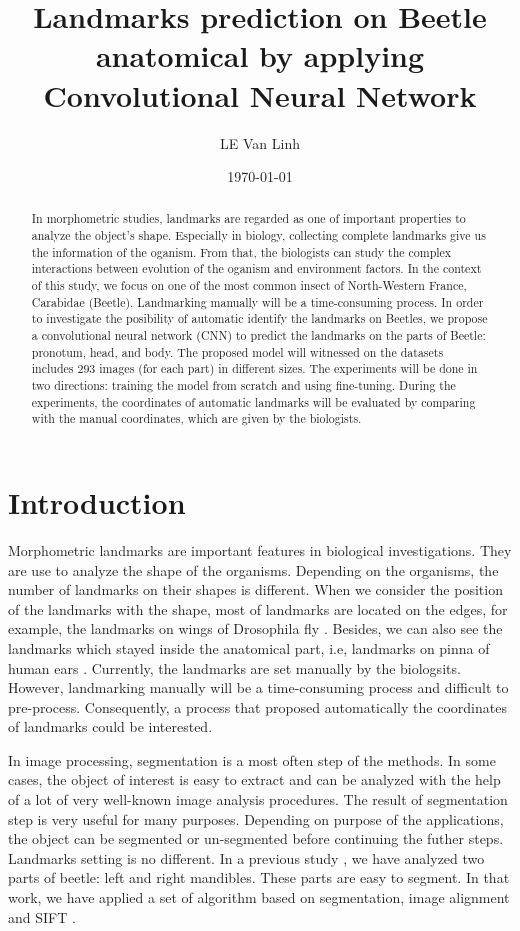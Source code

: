 \documentclass[12pt,a4paper]{article}
\begin{document}
\title{Landmarks prediction on Beetle anatomical by applying Convolutional Neural Network }
\author{LE Van Linh}
\date{\today}
\maketitle
\begin{abstract}
	In morphometric studies, landmarks are regarded as one of important properties to analyze the object's shape. Especially in biology, collecting complete landmarks give us the information of the oganism. From that, the biologists can study the complex interactions between evolution of the oganism and environment factors. In the context of this study, we focus on one of the most common insect of North-Western France, Carabidae (Beetle). Landmarking manually will be a time-consuming process. In order to investigate the posibility of automatic identify the landmarks on Beetles, we propose a convolutional neural network (CNN) to predict the landmarks on the parts of Beetle: pronotum, head, and body. The proposed model will witnessed on the datasets includes $293$ images (for each part) in different sizes. The experiments will be done in two directions: training the model from scratch and using fine-tuning. During the experiments, the coordinates of automatic landmarks will be evaluated by comparing with the manual coordinates, which are given by the biologists.
\end{abstract}
\section{Introduction}
Morphometric landmarks are important features in biological investigations. They are use to analyze the shape of the organisms. Depending on the organisms, the number of landmarks on their shapes is different. When we consider the position of the landmarks with the shape, most of landmarks are located on the edges, for example, the landmarks on wings of Drosophila fly \cite{.}. Besides, we can also see the landmarks which stayed inside the anatomical part, i.e, landmarks on pinna of human ears \cite{.}. Currently, the landmarks are set manually by the biologsits. However, landmarking manually will be a time-consuming process and difficult to pre-process. Consequently, a process that proposed automatically the coordinates of landmarks could be interested.

In image processing, segmentation is a most often step of the methods. In some cases, the object of
interest is easy to extract and can be analyzed with the help of a lot of very well-known image analysis procedures. The result of segmentation step is very useful for many purposes. Depending on purpose of the applications, the object can be segmented or un-segmented before continuing the futher steps. Landmarks setting is no different. In a previous study \cite{.}, we have analyzed two parts of beetle: left and right mandibles. These parts are easy to segment. In that work, we have applied a set of algorithm based on segmentation, image alignment and SIFT \cite{.}. 
\end{document}
